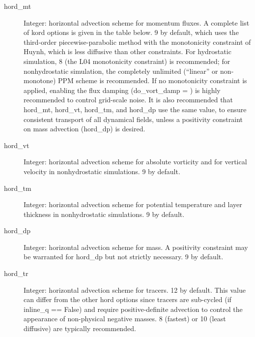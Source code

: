 \documentclass[12pt,letterpaper]{book}
\begin{document}
\begin{description}
\item[hord\_mt] Integer: horizontal advection scheme for momentum fluxes. A complete list of kord options is given in the table below. 
9 by default, which uses the third-order piecewise-parabolic method with the monotonicity constraint of Huynh, which is less diffusive than other constraints. For hydrostatic simulation, 8 (the L04 monotonicity constraint) is recommended; for nonhydrostatic simulation, the completely unlimited (``linear'' or non-monotone) PPM scheme is recommended. If no monotonicity constraint is applied, enabling the flux damping (do\_vort\_damp = \true ) is highly recommended to control grid-scale noise. It is also recommended that hord\_mt, hord\_vt, hord\_tm, and hord\_dp use the same value, to ensure consistent transport of all dynamical fields, unless a positivity constraint on mass advection (hord\_dp) is desired.

\item[hord\_vt] Integer: horizontal advection scheme for absolute vorticity and for vertical velocity in nonhydrostatic simulations. 
9 by default.


\item[hord\_tm] Integer: horizontal advection scheme for potential temperature and layer thickness in nonhydrostatic simulations. 
9 by default.


\item[hord\_dp] Integer: horizontal advection scheme for mass. A positivity constraint may be warranted for hord\_dp but not strictly necessary. 
9 by default.


\item[hord\_tr] Integer: horizontal advection scheme for tracers. 
12 by default. This value can differ from the other hord options since tracers are sub-cycled 
(if inline\_q == False) and require positive-definite advection to control the appearance of non-physical negative masses. 8 (fastest) or 10 (least diffusive) are typically recommended.


\end{description}
\end{document}
